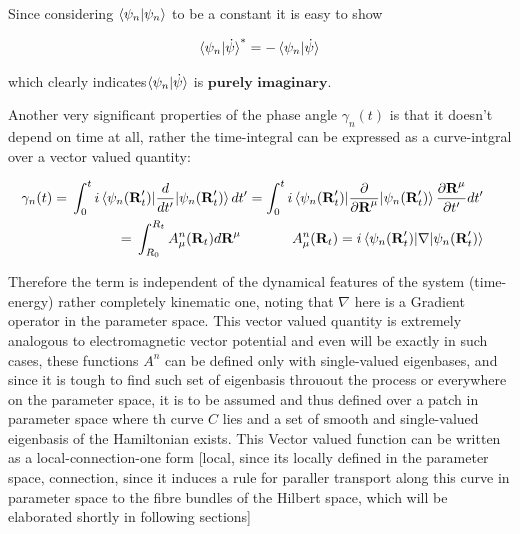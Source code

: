 \documentclass[8pt, twocoloumn]{article}
\begin{document}
Since considering $\braket{\psi_n|\psi_n}$ to be a constant it is easy to show 

\begin{align}
\braket{\psi_n|\dot{\psi}}^* = -\braket{\psi_n|\dot{\psi}}
\end{align}

which clearly indicates$ \braket{\psi_n|\dot{\psi}}$ is $\textbf{purely imaginary}$.

Another very significant properties of the phase angle $\gamma_n(t)$ is that it doesn't depend on time at all, rather the time-integral can be expressed as a curve-intgral over a vector valued quantity:

\begin{align}{\label{berryconnection}}
\begin{split}
\gamma_n(t) ={}&\int_{0}^{t} i \braket{\psi_n(\textbf{R}_t')|\frac{d}{dt'}|\psi_n(\textbf{R}_t')}dt' = \int_{0}^{t} i \braket{\psi_n(\textbf{R}_t')|\frac{\partial}{\partial \textbf{R}^{\mu}}|\psi_n(\textbf{R}_t')}\frac{\partial \textbf{R}^{\mu}}{\partial t'}dt' \notag
\end{split}\\
\begin{split}
={}& \int_{R_0}^{R_t} A^n_{\mu}(\textbf{R}_t)d \textbf{R}^{\mu} \ \ \ \ \ \ \ \ \ \ \ A^n_{\mu}(\textbf{R}_t) = i \braket{\psi_n(\textbf{R}_t')|\nabla|\psi_n(\textbf{R}_t')}
\end{split}
\end{align}

Therefore the term is independent of the dynamical features of the system (time-energy) rather completely kinematic one, noting that $\nabla$ here is a Gradient operator in the parameter space.
This vector valued quantity is extremely analogous to electromagnetic vector potential and even will be exactly in such cases, these functions $A^n$ can be defined only with single-valued eigenbases, and since it is tough to find such set of eigenbasis throuout the process or everywhere on the parameter space, it is to be assumed and thus defined over a patch in parameter space where th curve $C$ lies and a set of smooth and single-valued eigenbasis of the Hamiltonian exists.
This Vector valued function can be written as a local-connection-one form [local, since its locally defined in the parameter space, connection, since it induces a rule for paraller transport along this curve in parameter space to the fibre bundles of the Hilbert space, which will be elaborated shortly in following sections]
\end{document}
